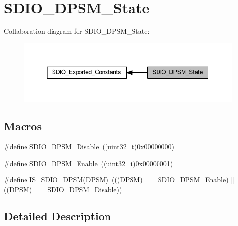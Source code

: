 \hypertarget{group___s_d_i_o___d_p_s_m___state}{}\section{S\+D\+I\+O\+\_\+\+D\+P\+S\+M\+\_\+\+State}
\label{group___s_d_i_o___d_p_s_m___state}
Collaboration diagram for S\+D\+I\+O\+\_\+\+D\+P\+S\+M\+\_\+\+State\+:
\nopagebreak
\begin{figure}[H]
\begin{center}
\leavevmode
\includegraphics[width=350pt]{group___s_d_i_o___d_p_s_m___state}
\end{center}
\end{figure}
\subsection*{Macros}
\begin{DoxyCompactItemize}
\item 
\#define \hyperlink{group___s_d_i_o___d_p_s_m___state_ga156a9f6ab87a46dcb99ddd7462ca064b}{S\+D\+I\+O\+\_\+\+D\+P\+S\+M\+\_\+\+Disable}~((uint32\+\_\+t)0x00000000)
\item 
\#define \hyperlink{group___s_d_i_o___d_p_s_m___state_ga22bc12465c1cf839145619a859276c37}{S\+D\+I\+O\+\_\+\+D\+P\+S\+M\+\_\+\+Enable}~((uint32\+\_\+t)0x00000001)
\item 
\#define \hyperlink{group___s_d_i_o___d_p_s_m___state_gac87a2d7a8fc417a4514d733be50e6d63}{I\+S\+\_\+\+S\+D\+I\+O\+\_\+\+D\+P\+SM}(D\+P\+SM)~(((D\+P\+SM) == \hyperlink{group___s_d_i_o___d_p_s_m___state_ga22bc12465c1cf839145619a859276c37}{S\+D\+I\+O\+\_\+\+D\+P\+S\+M\+\_\+\+Enable}) $\vert$$\vert$ ((D\+P\+SM) == \hyperlink{group___s_d_i_o___d_p_s_m___state_ga156a9f6ab87a46dcb99ddd7462ca064b}{S\+D\+I\+O\+\_\+\+D\+P\+S\+M\+\_\+\+Disable}))
\end{DoxyCompactItemize}


\subsection{Detailed Description}



